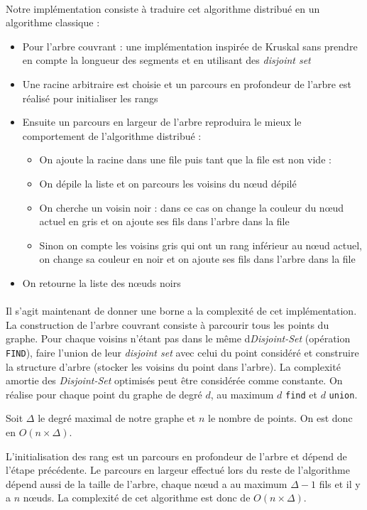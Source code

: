 \paragraph{}
Notre implémentation consiste à traduire cet algorithme distribué en un algorithme classique :
\begin{itemize}
\item Pour l'arbre couvrant : une implémentation inspirée de Kruskal sans prendre en compte la longueur des segments et en utilisant des \textit{disjoint set}
\item Une racine arbitraire est choisie et un parcours en profondeur de l'arbre est réalisé pour initialiser les rangs
\item Ensuite un parcours en largeur de l'arbre reproduira le mieux le comportement de l'algorithme distribué :
	\begin{itemize}
	\item On ajoute la racine dans une file puis tant que la file est non vide :
	\item On dépile la liste et on parcours les voisins du nœud dépilé
	\item On cherche un voisin noir : dans ce cas on change la couleur du nœud actuel en gris et on ajoute ses fils dans l'arbre dans la file
	\item Sinon on compte les voisins gris qui ont un rang inférieur au nœud actuel, on change sa couleur en noir et on ajoute ses fils dans l'arbre dans la file 
	\end{itemize}
\item On retourne la liste des nœuds noirs
\end{itemize}

\paragraph{}
Il s'agit maintenant de donner une borne a la complexité de cet implémentation.
La construction de l'arbre couvrant consiste à parcourir tous les points du graphe. Pour chaque voisins n'étant pas dans le même d\textit{Disjoint-Set} (opération \verb?FIND?), faire l'union de leur \textit{disjoint set} avec celui du point considéré et construire la structure d'arbre (stocker les voisins du point dans l'arbre).
La complexité amortie des \textit{Disjoint-Set} optimisés peut être considérée comme constante. On réalise pour chaque point du graphe de degré $d$, au maximum $d$ \verb?find? et $d$ \verb?union?.

Soit $\Delta$ le degré maximal de notre graphe et $n$ le nombre de points. On est donc en $O(n \times \Delta)$.

L'initialisation des rang est un parcours en profondeur de l'arbre et dépend de l'étape précédente.
Le parcours en largeur effectué lors du reste de l'algorithme dépend aussi de la taille de l'arbre, chaque nœud a au maximum $\Delta-1$ fils et il y a $n$ nœuds.
La complexité de cet algorithme est donc de $O(n \times \Delta)$.
